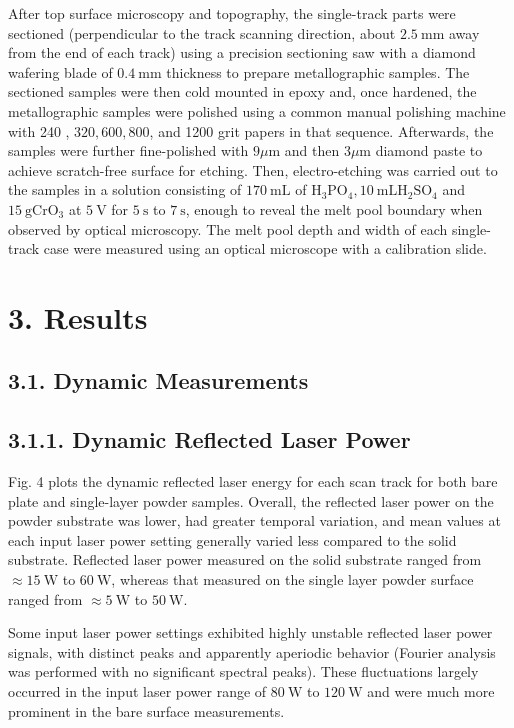 \documentclass[10pt]{article}
\begin{document}
After top surface microscopy and topography, the single-track parts were sectioned (perpendicular to the track scanning direction, about $2.5 \mathrm{~mm}$ away from the end of each track) using a precision sectioning saw with a diamond wafering blade of $0.4 \mathrm{~mm}$ thickness to prepare metallographic samples. The sectioned samples were then cold mounted in epoxy and, once hardened, the metallographic samples were polished using a common manual polishing machine with 240 , $320,600,800$, and 1200 grit papers in that sequence. Afterwards, the samples were further fine-polished with $9 \mu \mathrm{m}$ and then $3 \mu \mathrm{m}$ diamond paste to achieve scratch-free surface for etching. Then, electro-etching was carried out to the samples in a solution consisting of $170 \mathrm{~mL}$ of $\mathrm{H}_{3} \mathrm{PO}_{4}, 10 \mathrm{~mL} \mathrm{H}_{2} \mathrm{SO}_{4}$ and $15 \mathrm{~g} \mathrm{CrO}_{3}$ at $5 \mathrm{~V}$ for $5 \mathrm{~s}$ to $7 \mathrm{~s}$, enough to reveal the melt pool boundary when observed by optical microscopy. The melt pool depth and width of each single-track case were measured using an optical microscope with a calibration slide.

\section*{3. Results}
\subsection*{3.1. Dynamic Measurements}
\subsection*{3.1.1. Dynamic Reflected Laser Power}
Fig. 4 plots the dynamic reflected laser energy for each scan track for both bare plate and single-layer powder samples. Overall, the reflected laser power on the powder substrate was lower, had greater temporal variation, and mean values at each input laser power setting generally varied less compared to the solid substrate. Reflected laser power measured on the solid substrate ranged from $\approx 15 \mathrm{~W}$ to $60 \mathrm{~W}$, whereas that measured on the single layer powder surface ranged from $\approx 5 \mathrm{~W}$ to $50 \mathrm{~W}$.

Some input laser power settings exhibited highly unstable reflected laser power signals, with distinct peaks and apparently aperiodic behavior (Fourier analysis was performed with no significant spectral peaks). These fluctuations largely occurred in the input laser power range of $80 \mathrm{~W}$ to $120 \mathrm{~W}$ and were much more prominent in the bare surface measurements.
\end{document}
